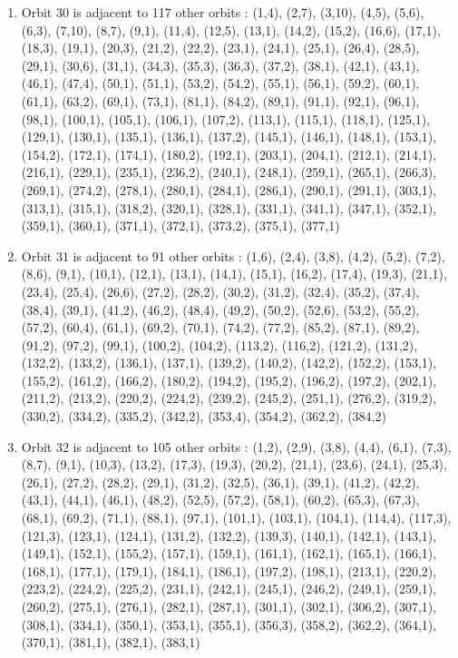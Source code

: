 \documentclass[12pt]{article}
\begin{document}
\begin{enumerate}
\item Orbit 30 is adjacent to 117 other orbits : (1,4), (2,7), (3,10), (4,5), (5,6), (6,3), (7,10), (8,7), (9,1), (11,4), (12,5), (13,1), (14,2), (15,2), (16,6), (17,1), (18,3), (19,1), (20,3), (21,2), (22,2), (23,1), (24,1), (25,1), (26,4), (28,5), (29,1), (30,6), (31,1), (34,3), (35,3), (36,3), (37,2), (38,1), (42,1), (43,1), (46,1), (47,4), (50,1), (51,1), (53,2), (54,2), (55,1), (56,1), (59,2), (60,1), (61,1), (63,2), (69,1), (73,1), (81,1), (84,2), (89,1), (91,1), (92,1), (96,1), (98,1), (100,1), (105,1), (106,1), (107,2), (113,1), (115,1), (118,1), (125,1), (129,1), (130,1), (135,1), (136,1), (137,2), (145,1), (146,1), (148,1), (153,1), (154,2), (172,1), (174,1), (180,2), (192,1), (203,1), (204,1), (212,1), (214,1), (216,1), (229,1), (235,1), (236,2), (240,1), (248,1), (259,1), (265,1), (266,3), (269,1), (274,2), (278,1), (280,1), (284,1), (286,1), (290,1), (291,1), (303,1), (313,1), (315,1), (318,2), (320,1), (328,1), (331,1), (341,1), (347,1), (352,1), (359,1), (360,1), (371,1), (372,1), (373,2), (375,1), (377,1)
\item Orbit 31 is adjacent to 91 other orbits : (1,6), (2,4), (3,8), (4,2), (5,2), (7,2), (8,6), (9,1), (10,1), (12,1), (13,1), (14,1), (15,1), (16,2), (17,4), (19,3), (21,1), (23,4), (25,4), (26,6), (27,2), (28,2), (30,2), (31,2), (32,4), (35,2), (37,4), (38,4), (39,1), (41,2), (46,2), (48,4), (49,2), (50,2), (52,6), (53,2), (55,2), (57,2), (60,4), (61,1), (69,2), (70,1), (74,2), (77,2), (85,2), (87,1), (89,2), (91,2), (97,2), (99,1), (100,2), (104,2), (113,2), (116,2), (121,2), (131,2), (132,2), (133,2), (136,1), (137,1), (139,2), (140,2), (142,2), (152,2), (153,1), (155,2), (161,2), (166,2), (180,2), (194,2), (195,2), (196,2), (197,2), (202,1), (211,2), (213,2), (220,2), (224,2), (239,2), (245,2), (251,1), (276,2), (319,2), (330,2), (334,2), (335,2), (342,2), (353,4), (354,2), (362,2), (384,2)
\item Orbit 32 is adjacent to 105 other orbits : (1,2), (2,9), (3,8), (4,4), (6,1), (7,3), (8,7), (9,1), (10,3), (13,2), (17,3), (19,3), (20,2), (21,1), (23,6), (24,1), (25,3), (26,1), (27,2), (28,2), (29,1), (31,2), (32,5), (36,1), (39,1), (41,2), (42,2), (43,1), (44,1), (46,1), (48,2), (52,5), (57,2), (58,1), (60,2), (65,3), (67,3), (68,1), (69,2), (71,1), (88,1), (97,1), (101,1), (103,1), (104,1), (114,4), (117,3), (121,3), (123,1), (124,1), (131,2), (132,2), (139,3), (140,1), (142,1), (143,1), (149,1), (152,1), (155,2), (157,1), (159,1), (161,1), (162,1), (165,1), (166,1), (168,1), (177,1), (179,1), (184,1), (186,1), (197,2), (198,1), (213,1), (220,2), (223,2), (224,2), (225,2), (231,1), (242,1), (245,1), (246,2), (249,1), (259,1), (260,2), (275,1), (276,1), (282,1), (287,1), (301,1), (302,1), (306,2), (307,1), (308,1), (334,1), (350,1), (353,1), (355,1), (356,3), (358,2), (362,2), (364,1), (370,1), (381,1), (382,1), (383,1)

\end{enumerate}
\end{document}
